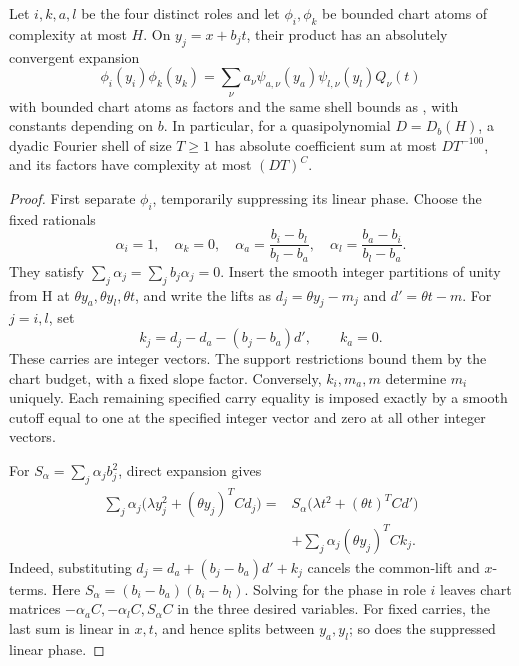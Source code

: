 \begin{lemma}\label{lem:progression-separation}
Let \(i,k,a,l\) be the four distinct roles and let \(\phi_i,\phi_k\)
be bounded chart atoms of complexity at most \(H\).  On
\(y_j=x+b_jt\), their product has an absolutely convergent expansion
\[
 \phi_i(y_i)\phi_k(y_k)
   =\sum_\nu a_\nu\psi_{a,\nu}(y_a)
                         \psi_{l,\nu}(y_l)Q_\nu(t)
\]
with bounded chart atoms as factors and the same shell bounds as
\cite[Lemma~4.5]{H}, with constants depending on \(b\).
In particular, for a quasipolynomial \(D=D_b(H)\), a dyadic Fourier
shell of size \(T\ge1\) has absolute coefficient sum at most
\(DT^{-100}\), and its factors have complexity at most \((DT)^C\).
\end{lemma}
\begin{proof}
First separate \(\phi_i\), temporarily suppressing its linear phase.
Choose the fixed rationals
\[
 \alpha_i=1,\quad\alpha_k=0,\quad
 \alpha_a=\frac{b_i-b_l}{b_l-b_a},\quad
 \alpha_l=\frac{b_a-b_i}{b_l-b_a}.
\]
They satisfy \(\sum_j\alpha_j=\sum_jb_j\alpha_j=0\).  Insert the
smooth integer partitions of unity from H at
\(\theta y_a,\theta y_l,\theta t\), and write the lifts as
\(d_j=\theta y_j-m_j\) and \(d'=\theta t-m\).  For \(j=i,l\), set
\[
 k_j=d_j-d_a-(b_j-b_a)d',\qquad k_a=0.
\]
These carries are integer vectors.  The support restrictions bound
them by the chart budget, with a fixed slope factor.  Conversely,
\(k_i,m_a,m\) determine \(m_i\) uniquely.  Each remaining specified
carry equality is imposed exactly by a smooth cutoff equal to one at
the specified integer vector and zero at all other integer vectors.

For \(S_\alpha=\sum_j\alpha_jb_j^2\), direct expansion gives
\begin{equation}
 \begin{split}
 \sum_j\alpha_j\bigl(\lambda y_j^2+(\theta y_j)^TCd_j\bigr)
  ={}&S_\alpha\bigl(\lambda t^2+(\theta t)^TCd'\bigr)\\
    &+\sum_j\alpha_j(\theta y_j)^TCk_j.
 \end{split}
 \label{eq:analytic-separation-identity}
\end{equation}
Indeed, substituting \(d_j=d_a+(b_j-b_a)d'+k_j\) cancels the
common-lift and \(x\)-terms.  Here
\(S_\alpha=(b_i-b_a)(b_i-b_l)\).  Solving for the phase in role
\(i\) leaves chart matrices \(-\alpha_aC,-\alpha_lC,S_\alpha C\)
in the three desired variables.  For fixed carries, the last sum is
linear in \(x,t\), and hence splits between \(y_a,y_l\); so does the
suppressed linear phase.


\end{proof}
